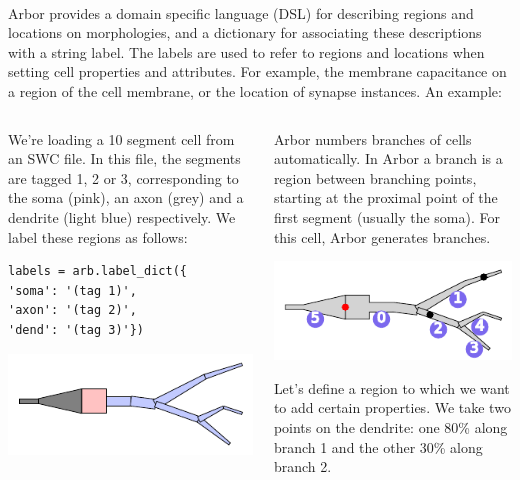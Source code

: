 \documentclass{beamer}
\newcommand*\circled[1]{\tikz[baseline=(char.base)]{\node[shape=circle,fill,inner sep=2pt] (char) {\textcolor{white}{#1}};}} %
\begin{document}
\begin{frame}[t, fragile]
  \textbf{}\\
      Arbor provides a domain specific language (DSL) for describing regions and locations on morphologies, and a dictionary for associating these descriptions with a string label. The labels are used to refer to regions and locations when setting cell properties and attributes. For example, the membrane capacitance on a region of the cell membrane, or the location of synapse instances. An example:
  \vspace*{1ex}

      \begin{columns}[onlytextwidth,T]

        \begin{column}{0.33\textwidth}
          \circled{1} We're loading a 10 segment cell from an SWC file. In this file, the segments are tagged 1, 2 or 3, corresponding to the soma (pink), an axon (grey) and a dendrite (light blue) respectively. We label these regions as follows:
\begin{verbatim}
labels = arb.label_dict({
'soma': '(tag 1)',
'axon': '(tag 2)',
'dend': '(tag 3)'})
\end{verbatim}
          \begin{center}\includegraphics[width=0.8\linewidth]{scripts/morph.pdf}\end{center}
        \end{column}

        \begin{column}{0.33\textwidth}
          \circled{2} Arbor numbers branches of cells automatically. In Arbor a branch is a region between branching points, starting at the proximal point {\color{red}\circled{-}} of the first segment (usually the soma). For this cell, Arbor generates {\color{mediumslateblue}\circled{6}} branches.
          \begin{center}\includegraphics[width=0.8\linewidth]{scripts/branches.pdf}\end{center}
          Let's define a region to which we want to add certain properties. We take two points {\color{black}\circled{-}} on the dendrite: one 80\% along branch 1 and the other 30\% along branch 2.
        \end{column}


\end{columns}
\end{frame}
\end{document}
